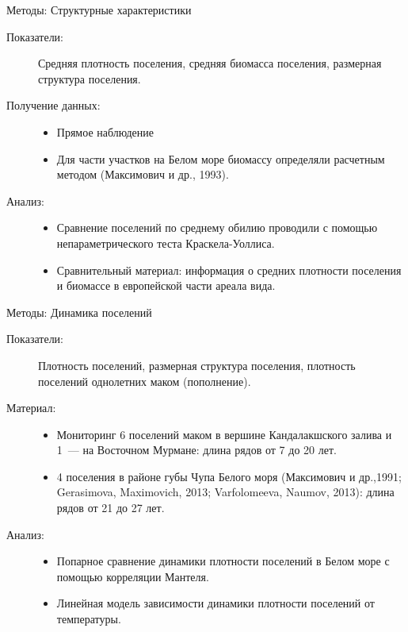 \documentclass{beamer}
\begin{document}
\begin{frame}{Методы: Структурные характеристики}
 \begin{description}
	\item [Показатели:] Средняя плотность поселения, средняя биомасса поселения, размерная структура поселения.
	\item [Получение данных:] 
		\begin{itemize}
			\item Прямое наблюдение
			\item Для части участков на Белом море биомассу определяли расчетным методом (Максимович и др., 1993).
		\end{itemize}
	\item [Анализ:] 
		\begin{itemize}
			\item Сравнение поселений по среднему обилию проводили с помощью непараметрического теста Краскела-Уоллиса.
			\item Сравнительный материал: информация о средних плотности поселения и биомассе в европейской части ареала вида.
		\end{itemize}	
\end{description}
\end{frame}

\begin{frame}{Методы: Динамика поселений}
\begin{small}
 \begin{description}
	\item [Показатели:] Плотность поселений, размерная структура поселения, плотность поселений однолетних маком (пополнение).
	\item [Материал:] 
		\begin{itemize}
			\item Мониторинг 6 поселений маком в вершине Кандалакшского залива и 1~--- на Восточном Мурмане: длина рядов от 7 до 20 лет.
			\item 4 поселения в районе губы Чупа Белого моря (Максимович и др.,1991; Gerasimova, Maximovich, 2013; Varfolomeeva, Naumov, 2013): длина рядов от 21 до 27 лет.
		\end{itemize}
	\item [Анализ:] 
		\begin{itemize}
			\item Попарное сравнение динамики плотности поселений в Белом море с помощью корреляции Мантеля.
			\item Линейная модель зависимости динамики плотности поселений  от температуры.
		\end{itemize}
\end{description}
\end{small}
\end{frame}
\end{document}
